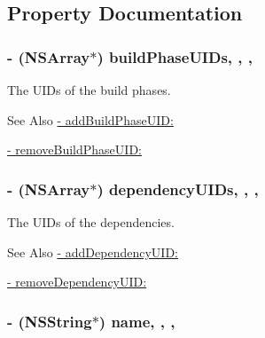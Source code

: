 \subsection{Property Documentation}
\hypertarget{interface_f_f_x_c_target_a7f5d03792ca63195a8c091b549068fd8}{
\subsubsection[{build\-Phase\-U\-I\-Ds}]{\setlength{\rightskip}{0pt plus 5cm}-\/ (N\-S\-Array$\ast$) build\-Phase\-U\-I\-Ds\hspace{0.3cm}{\ttfamily [read]}, {\ttfamily [write]}, {\ttfamily [nonatomic]}, {\ttfamily [strong]}}}\label{interface_f_f_x_c_target_a7f5d03792ca63195a8c091b549068fd8}
The U\-I\-Ds of the build phases. \begin{DoxySeeAlso}{See Also}
\hyperlink{interface_f_f_x_c_target_aac7f6180aacfcc579157f31047c72eae}{-\/ add\-Build\-Phase\-U\-I\-D\-:} 

\hyperlink{interface_f_f_x_c_target_a6dc9555e9a0af3da49395bbddea0e03e}{-\/ remove\-Build\-Phase\-U\-I\-D\-:} 
\end{DoxySeeAlso}
\hypertarget{interface_f_f_x_c_target_a97c24ff46843ece8531ee0d04a405563}{
\subsubsection[{dependency\-U\-I\-Ds}]{\setlength{\rightskip}{0pt plus 5cm}-\/ (N\-S\-Array$\ast$) dependency\-U\-I\-Ds\hspace{0.3cm}{\ttfamily [read]}, {\ttfamily [write]}, {\ttfamily [nonatomic]}, {\ttfamily [strong]}}}\label{interface_f_f_x_c_target_a97c24ff46843ece8531ee0d04a405563}
The U\-I\-Ds of the dependencies. \begin{DoxySeeAlso}{See Also}
\hyperlink{interface_f_f_x_c_target_ab6361eaf15608584bd7cf287d579ce76}{-\/ add\-Dependency\-U\-I\-D\-:} 

\hyperlink{interface_f_f_x_c_target_aabbdf12df0f26158985ea7022d41455a}{-\/ remove\-Dependency\-U\-I\-D\-:} 
\end{DoxySeeAlso}
\hypertarget{interface_f_f_x_c_target_a4b93d352d2fca75b34e1b5a50e03f587}{
\subsubsection[{name}]{\setlength{\rightskip}{0pt plus 5cm}-\/ (N\-S\-String$\ast$) name\hspace{0.3cm}{\ttfamily [read]}, {\ttfamily [write]}, {\ttfamily [nonatomic]}, {\ttfamily [strong]}}}\label{interface_f_f_x_c_target_a4b93d352d2fca75b34e1b5a50e03f587}
